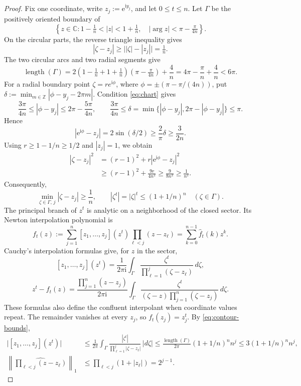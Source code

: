\documentclass[11pt]{article}
\newcommand{\C}{\mathbb C}
\newcommand{\Z}{\mathbb Z}
\newcommand{\ii}{\mathrm i}
\begin{document}
\begin{proof}
Fix one coordinate, write $z_j:=\mathrm e^{\ii y_j}$, and let $0\le t\le n$. Let $\Gamma$ be the positively oriented boundary of
\[
\left\{z\in\C:1-\tfrac1n<|z|<1+\tfrac1n,\quad |\arg z|<\pi-\tfrac\pi{4n}\right\}.
\]
On the circular parts, the reverse triangle inequality gives
\[
|\zeta-z_j|\ge\bigl||\zeta|-|z_j|\bigr|=\tfrac1n.
\]
The two circular arcs and two radial segments give
\[
\operatorname{length}(\Gamma)=2\left(1-\tfrac1n+1+\tfrac1n\right)\left(\pi-\tfrac\pi{4n}\right)+\frac4n=4\pi-\frac\pi n+\frac4n<6\pi.
\]
For a radial boundary point $\zeta=re^{\ii\phi}$, where $\phi=\pm(\pi-\pi/(4n))$, put $\delta:=\min_{m\in\Z}|\phi-y_j-2\pi m|$. Condition \eqref{eq:chart} gives
\[
\frac{3\pi}{4n}\le|\phi-y_j|\le2\pi-\frac{5\pi}{4n},\qquad \frac{3\pi}{4n}\le\delta=\min\{|\phi-y_j|,2\pi-|\phi-y_j|\}\le\pi.
\]
Hence
\[
|\mathrm e^{\ii\phi}-z_j|=2\sin(\delta/2)\ge\frac2\pi\delta\ge\frac3{2n}.
\]
Using $r\ge1-1/n\ge1/2$ and $|z_j|=1$, we obtain
\begin{align*}
|\zeta-z_j|^2&=(r-1)^2+r|\mathrm e^{\ii\phi}-z_j|^2\\
&\ge(r-1)^2+\frac{9r}{4n^2}\ge\frac9{8n^2}\ge\frac1{n^2}.
\end{align*}
Consequently,
\begin{equation}\label{eq:contour-bounds}
\min_{\zeta\in\Gamma,\,j}|\zeta-z_j|\ge\frac1n,\qquad |\zeta^t|=|\zeta|^t\le(1+1/n)^n\quad(\zeta\in\Gamma).
\end{equation}
The principal branch of $z^t$ is analytic on a neighborhood of the closed sector. Its Newton interpolation polynomial is
\[
f_t(z):=\sum_{j=1}^n[z_1,\ldots,z_j](z^t)\prod_{\ell<j}(z-z_\ell)=\sum_{k=0}^{n-1}\widehat f_t(k)z^k.
\]
Cauchy's interpolation formulas give, for $z$ in the sector,
\[
[z_1,\ldots,z_j](z^t)=\frac1{2\pi\ii}\int_\Gamma\frac{\zeta^t}{\prod_{\ell=1}^j(\zeta-z_\ell)}\,d\zeta,
\]
\[
z^t-f_t(z)=\frac{\prod_{j=1}^n(z-z_j)}{2\pi\ii}\int_\Gamma\frac{\zeta^t}{(\zeta-z)\prod_{j=1}^n(\zeta-z_j)}\,d\zeta.
\]
These formulas also define the confluent interpolant when coordinate values repeat. The remainder vanishes at every $z_j$, so $f_t(z_j)=z_j^t$. By \eqref{eq:contour-bounds},
\begin{align*}
\bigl|[z_1,\ldots,z_j](z^t)\bigr|&\le\frac1{2\pi}\int_\Gamma\frac{|\zeta^t|}{\prod_{\ell=1}^j|\zeta-z_\ell|}\,|d\zeta|\le\frac{\operatorname{length}(\Gamma)}{2\pi}(1+1/n)^n n^j\le3(1+1/n)^n n^j,\\
\left\|\widehat{\prod_{\ell<j}(z-z_\ell)}\right\|_1&\le\prod_{\ell<j}(1+|z_\ell|)=2^{j-1}.
\end{align*}

\end{proof}
\end{document}
